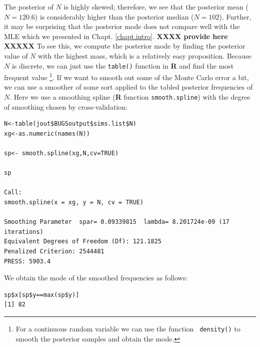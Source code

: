 The posterior of $N$ is highly skewed; therefore, we see that the 
posterior mean
($N=120.6$) is considerably higher than the posterior median
($N=102$).
Further, it may be surprising that the posterior
mode does not compare well with the MLE which we presented in
Chapt. \ref{chapt.intro}. {\bf XXXX provide here XXXXX}
To see this, we compute the posterior mode by finding
the posterior value of $N$ with the highest mass, which is a
relatively easy proposition. Because $N$ is discrete, we can just use
the \mbox{\tt table()} function in {\bf R} and find the most frequent value
\footnote{For a continuous random variable we can use the function
 \mbox{\tt
    density()} to smooth the posterior samples and obtain the mode.}.
If we want to smooth out some of the Monte
Carlo error a bit, we can use a smoother of some sort applied to the tabled
posterior frequencies of $N$. Here we use a smoothing spline ({\bf R}
function \mbox{\tt smooth.spline}) with the
degree of smoothing chosen by cross-validation:
\begin{verbatim}
N<-table(jout$BUGSoutput$sims.list$N)
xg<-as.numeric(names(N))

sp<- smooth.spline(xg,N,cv=TRUE)
 
sp  

Call:
smooth.spline(x = xg, y = N, cv = TRUE)

Smoothing Parameter  spar= 0.09339815  lambda= 8.201724e-09 (17 iterations) 
Equivalent Degrees of Freedom (Df): 121.1825 
Penalized Criterion: 2544481 
PRESS: 5903.4 
\end{verbatim}
We obtain the mode of the smoothed frequencies as follows:
\begin{verbatim}
sp$x[sp$y==max(sp$y)]
[1] 82
\end{verbatim}



